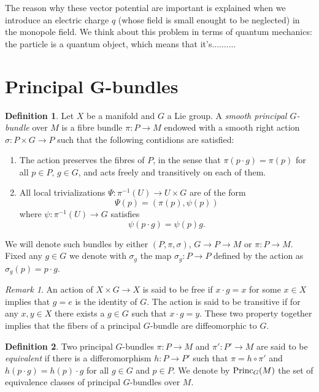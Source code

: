 \documentclass{article}
\theoremstyle{definition}
\newtheorem{defi}{Definition}
\theoremstyle{remark}
\newtheorem{rmk}{Remark}
\begin{document}
The reason why these vector potential are important is explained when we introduce an electric charge \(q\) (whose field is small enought to be neglected) in the monopole field. We think about this problem in terms of quantum mechanics: the particle is a quantum object, which means that it's..........


\section{Principal G-bundles}

\begin{defi}
Let \(X\) be a manifold and \(G\) a Lie group. 
A \emph{smooth principal \(G\)-bundle} over \(M\) is a fibre bundle \(\pi\colon P \to M\) endowed with a smooth right action \(\sigma\colon P\times G\to P\) such that the following contidions are satisfied:
\begin{enumerate}
    \item The action preserves the fibres of \(P\), in the sense that \(\pi(p\cdot g)=\pi(p)\) for all \(p\in P,\, g\in G\), and acts freely and transitively on each of them.
    \item All local trivializations \(\Psi\colon \pi^{-1}(U)\to U\times G\) are of the form 
    \begin{equation}\label{eq1 loc triv}
        \Psi (p)=(\pi(p),\psi(p))
    \end{equation}
    where \(\psi\colon \pi^{-1}(U)\to G\) satisfies
    \begin{equation}\label{eq2 loc triv}
        \psi(p\cdot g)=\psi(p)g.
    \end{equation}
\end{enumerate}
We will denote such bundles by either \((P,\pi,\sigma)\), \(G\to P\to M\) or \(\pi\colon P\to M\). Fixed any \(g\in G\) we denote with \(\sigma_g\) the map \(\sigma_g\colon P\to P\) defined by the action as \(\sigma_g(p)=p\cdot g\).
\end{defi}

\begin{rmk}
    An action of \(X\times G \to X\) is said to be free if \(x\cdot g=x\) for some \(x\in X\) implies that \(g=e\) is the identity of \(G\). The action is said to be transitive if for any \(x,y\in X\) there exists a \(g\in G\) such that \(x\cdot g = y\).
    These two property together implies that the fibers of a principal \(G\)-bundle are diffeomorphic to \(G\).
\end{rmk}

\begin{defi}
Two principal \(G\)-bundles \(\pi\colon P\to M\) and \(\pi'\colon P'\to M\) are said to be \emph{equivalent} if there is a differomorphism \(h\colon P\to P'\) such that \(\pi = h\circ \pi'\) and \(h(p\cdot g)=h(p)\cdot g\) for all \(g\in G\) and \(p\in P\).
We denote by \(\text{Princ}_G(M)\) the set of equivalence classes of principal \(G\)-bundles over \(M\).
\end{defi}
\end{document}
